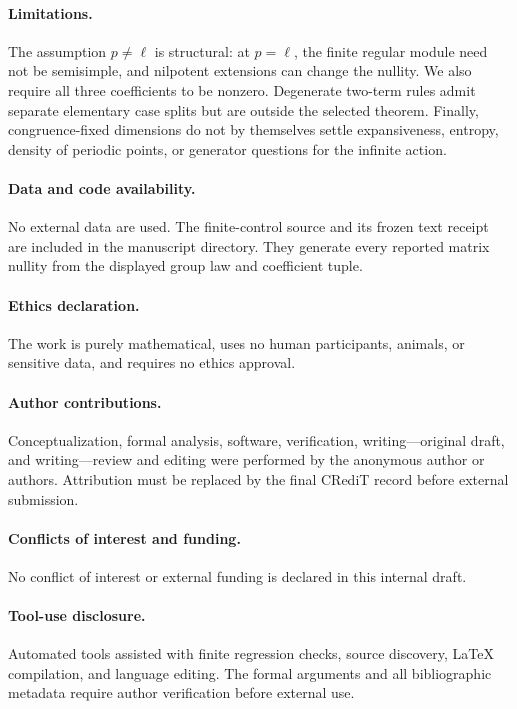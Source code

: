 \paragraph{Limitations.}
The assumption $p\ne\ell$ is structural: at $p=\ell$, the finite regular
module need not be semisimple, and nilpotent extensions can change the
nullity.  We also require all three coefficients to be nonzero.  Degenerate
two-term rules admit separate elementary case splits but are outside the
selected theorem.  Finally, congruence-fixed dimensions do not by themselves
settle expansiveness, entropy, density of periodic points, or generator
questions for the infinite action.

\paragraph{Data and code availability.}
No external data are used.  The finite-control source and its frozen text
receipt are included in the manuscript directory.  They generate every
reported matrix nullity from the displayed group law and coefficient tuple.

\paragraph{Ethics declaration.}
The work is purely mathematical, uses no human participants, animals, or
sensitive data, and requires no ethics approval.

\paragraph{Author contributions.}
Conceptualization, formal analysis, software, verification, writing---original
draft, and writing---review and editing were performed by the anonymous
author or authors.  Attribution must be replaced by the final CRediT record
before external submission.

\paragraph{Conflicts of interest and funding.}
No conflict of interest or external funding is declared in this internal
draft.

\paragraph{Tool-use disclosure.}
Automated tools assisted with finite regression checks, source discovery,
LaTeX compilation, and language editing.  The formal arguments and all
bibliographic metadata require author verification before external use.
